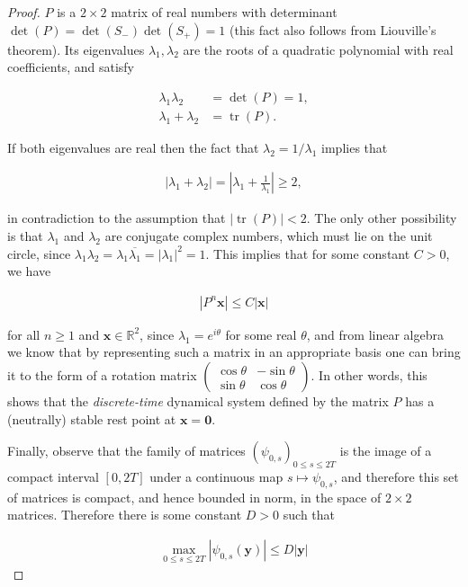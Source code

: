 \documentclass[11pt]{report}
\newcommand{\R}{\mathbb{R}}
\theoremstyle{plain}
\theoremstyle{definition}
\begin{document}
\begin{proof}
$P$ is a $2\times 2$ matrix of real numbers with
determinant $\det(P)=\det(S_-)\det(S_+)=1$ (this fact
also follows from Liouville's theorem). Its
eigenvalues $\lambda_1, \lambda_2$ are the roots of a
quadratic polynomial with real coefficients, and
satisfy

\begin{align*}
\lambda_1 \lambda_2 &= \det(P)=1, \\
\lambda_1 + \lambda_2 &= \operatorname{tr}(P).
\end{align*}

\noindent If both eigenvalues are real then the fact that
$\lambda_2=1/\lambda_1$ implies that

\begin{align*}
|\lambda_1 + \lambda_2| = \left|\lambda_1 + \frac{1}{\lambda_1}\right| \ge 2,
\end{align*}

\noindent in contradiction to the assumption that
$|\operatorname{tr}(P)|<2$. The only other possibility
is that $\lambda_1$ and $\lambda_2$ are conjugate
complex numbers, which must lie on the unit circle,
since
$\lambda_1\lambda_2 = \lambda_1 \overline{\lambda_1}=
|\lambda_1|^2 = 1$.
This implies that for some constant $C>0$, we have

\begin{align*}
|P^n \mathbf{x}| \le C |\mathbf{x}|
\end{align*}

\noindent for all $n\ge1$ and $\mathbf{x}\in \R^2$, since
$\lambda_1=e^{i\theta}$ for some real $\theta$, and
from linear algebra we know that by representing such
a matrix in an appropriate basis one can bring it to
the form of a rotation matrix
$\left(\begin{array}{cc} \cos \theta & -\sin\theta \\
\sin\theta & \cos\theta\end{array} \right)$.
In other words, this shows that the \emph{discrete-time}
dynamical system defined by the matrix $P$ has a
(neutrally) stable rest point at
$\mathbf{x}=\mathbf{0}$.

Finally, observe that the family of matrices
$(\psi_{0,s})_{0\le s\le 2T}$ is the image of a
compact interval $[0,2T]$ under a continuous map
$s\mapsto \psi_{0,s}$, and therefore this set of
matrices is compact, and hence bounded in norm, in the
space of $2\times 2$ matrices. Therefore there is some
constant $D>0$ such that

\begin{align*}
\max_{0\le s\le 2T} |\psi_{0,s}(\mathbf{y}) | \le D |\mathbf{y}|
\end{align*}


\end{proof}
\end{document}
